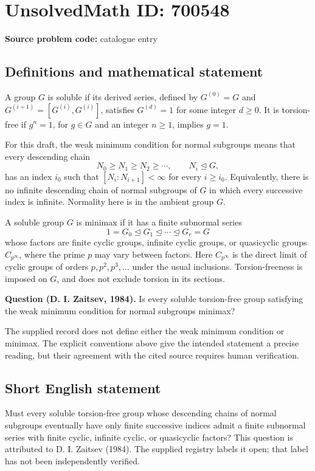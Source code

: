 \documentclass[11pt]{article}
\begin{document}
\section*{UnsolvedMath ID: 700548}
\textbf{Source problem code:} catalogue entry
\subsection{Definitions and mathematical statement}
A group \(G\) is soluble if its derived series, defined by \(G^{(0)}=G\) and \(G^{(i+1)}=[G^{(i)},G^{(i)}]\), satisfies \(G^{(d)}=1\) for some integer \(d\geq 0\). It is torsion-free if \(g^n=1\), for \(g\in G\) and an integer \(n\geq 1\), implies \(g=1\).

For this draft, the weak minimum condition for normal subgroups means that every descending chain
\[
N_0\geq N_1\geq N_2\geq\cdots,\qquad N_i\trianglelefteq G,
\]
has an index \(i_0\) such that \([N_i:N_{i+1}]<\infty\) for every \(i\geq i_0\). Equivalently, there is no infinite descending chain of normal subgroups of \(G\) in which every successive index is infinite. Normality here is in the ambient group \(G\).

A soluble group \(G\) is minimax if it has a finite subnormal series
\[
1=G_0\trianglelefteq G_1\trianglelefteq\cdots\trianglelefteq G_r=G
\]
whose factors are finite cyclic groups, infinite cyclic groups, or quasicyclic groups \(C_{p^\infty}\), where the prime \(p\) may vary between factors. Here \(C_{p^\infty}\) is the direct limit of cyclic groups of orders \(p,p^2,p^3,\ldots\) under the usual inclusions. Torsion-freeness is imposed on \(G\), and does not exclude torsion in its sections.

\textbf{Question (D. I. Zaitsev, 1984).} Is every soluble torsion-free group satisfying the weak minimum condition for normal subgroups minimax?

The supplied record does not define either the weak minimum condition or minimax. The explicit conventions above give the intended statement a precise reading, but their agreement with the cited source requires human verification.
\subsection{Short English statement}
Must every soluble torsion-free group whose descending chains of normal subgroups eventually have only finite successive indices admit a finite subnormal series with finite cyclic, infinite cyclic, or quasicyclic factors? This question is attributed to D. I. Zaitsev (1984). The supplied registry labels it open; that label has not been independently verified.
\end{document}
